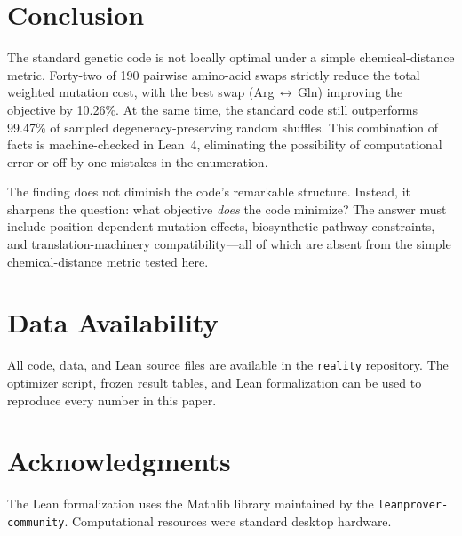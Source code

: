 \documentclass[11pt,twocolumn]{article}
\begin{document}
\section{Conclusion}

The standard genetic code is not locally optimal under a simple
chemical-distance metric. Forty-two of 190 pairwise amino-acid swaps
strictly reduce the total weighted mutation cost, with the best swap
(Arg\,$\leftrightarrow$\,Gln) improving the objective by 10.26\%.
At the same time, the standard code still outperforms 99.47\% of sampled
degeneracy-preserving random shuffles. This combination of facts is
machine-checked in Lean~4, eliminating the possibility of computational
error or off-by-one mistakes in the enumeration.

The finding does not diminish the code's remarkable structure. Instead, it
sharpens the question: what objective \emph{does} the code minimize? The
answer must include position-dependent mutation effects, biosynthetic
pathway constraints, and translation-machinery compatibility---all of which
are absent from the simple chemical-distance metric tested here.

\section*{Data Availability}

All code, data, and Lean source files are available in the
\texttt{reality} repository. The optimizer script, frozen result tables,
and Lean formalization can be used to reproduce every number in this paper.

\section*{Acknowledgments}

The Lean formalization uses the Mathlib library maintained by the
\texttt{leanprover-community}. Computational resources were standard
desktop hardware.
\end{document}
